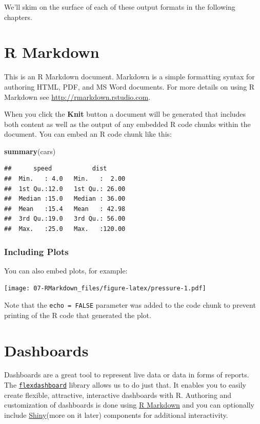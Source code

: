 \documentclass[]{book}
\newenvironment{Shaded}{\begin{snugshade}}{\end{snugshade}}
\newcommand{\KeywordTok}[1]{\textcolor[rgb]{0.13,0.29,0.53}{\textbf{#1}}}
\newcommand{\NormalTok}[1]{#1}
\theoremstyle{definition}
\theoremstyle{definition}
\theoremstyle{definition}
\theoremstyle{remark}
\begin{document}
We'll skim on the surface of each of these output formats in the
following chapters.

\section{R Markdown}\label{r-markdown}

This is an R Markdown document. Markdown is a simple formatting syntax
for authoring HTML, PDF, and MS Word documents. For more details on
using R Markdown see \url{http://rmarkdown.rstudio.com}.

When you click the \textbf{Knit} button a document will be generated
that includes both content as well as the output of any embedded R code
chunks within the document. You can embed an R code chunk like this:

\begin{Shaded}
\begin{Highlighting}[]
\KeywordTok{summary}\NormalTok{(cars)}
\end{Highlighting}
\end{Shaded}

\begin{verbatim}
##      speed           dist       
##  Min.   : 4.0   Min.   :  2.00  
##  1st Qu.:12.0   1st Qu.: 26.00  
##  Median :15.0   Median : 36.00  
##  Mean   :15.4   Mean   : 42.98  
##  3rd Qu.:19.0   3rd Qu.: 56.00  
##  Max.   :25.0   Max.   :120.00
\end{verbatim}

\subsubsection{Including Plots}\label{including-plots}

You can also embed plots, for example:

\texttt{[image: 07-RMarkdown\_files/figure-latex/pressure-1.pdf]}

Note that the \texttt{echo\ =\ FALSE} parameter was added to the code
chunk to prevent printing of the R code that generated the plot.

\section{Dashboards}\label{dashboards}

Dashboards are a great tool to represent live data or data in forms of
reports. The
\href{http://rmarkdown.rstudio.com/flexdashboard/}{\texttt{flexdashboard}}
library allows us to do just that. It enables you to easily create
flexible, attractive, interactive dashboards with R. Authoring and
customization of dashboards is done using
\href{http://rmarkdown.rstudio.com/}{R Markdown} and you can optionally
include \href{http://shiny.rstudio.com/}{Shiny}(more on it later)
components for additional interactivity.
\end{document}
